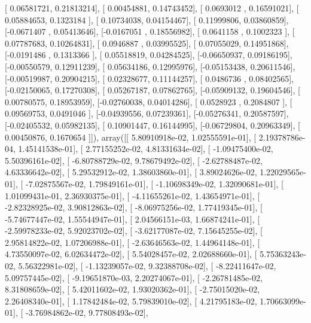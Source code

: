 \documentclass{article}
\begin{document}
       [ 0.06581721,  0.21813214],
       [ 0.00454881,  0.14743452],
       [ 0.0693012 ,  0.16591021],
       [ 0.05884653,  0.1323184 ],
       [ 0.10734038,  0.04154467],
       [ 0.11999806,  0.03860859],
       [-0.0671407 ,  0.05413646],
       [-0.0167051 ,  0.18556982],
       [ 0.0641158 ,  0.1002323 ],
       [ 0.07787683,  0.10264831],
       [ 0.0946887 ,  0.03995525],
       [ 0.07055029,  0.14951868],
       [-0.0191486 ,  0.1313366 ],
       [ 0.05518819,  0.04284525],
       [-0.06650937,  0.09186195],
       [-0.00550579,  0.12911239],
       [ 0.05634186,  0.12995976],
       [-0.05153438,  0.20611546],
       [-0.00519987,  0.20904215],
       [ 0.02328677,  0.11144257],
       [ 0.0486736 ,  0.08402565],
       [-0.02150065,  0.17270308],
       [ 0.05267187,  0.07862765],
       [-0.05909132,  0.19604546],
       [ 0.00780575,  0.18953959],
       [-0.02760038,  0.04014286],
       [ 0.0528923 ,  0.2084807 ],
       [ 0.09569753,  0.0491046 ],
       [-0.04939556,  0.07239361],
       [-0.05276341,  0.20587597],
       [-0.02405532,  0.05982135],
       [ 0.10901447,  0.16144995],
       [-0.06729804,  0.20963349],
       [ 0.00450876,  0.1670654 ]]), array([[  5.80910918e-02,   1.02555591e-01],
       [  2.19378786e-04,   1.45141538e-01],
       [  2.77155252e-02,   4.81331634e-02],
       [ -1.09475400e-02,   5.50396161e-02],
       [ -6.80788729e-02,   9.78679492e-02],
       [ -2.62788487e-02,   4.63336642e-02],
       [  5.29532912e-02,   1.38603860e-01],
       [  3.89024626e-02,   1.22029565e-01],
       [ -7.02875567e-02,   1.79849161e-01],
       [ -1.10698349e-02,   1.32090681e-01],
       [  1.01099431e-01,   2.36930375e-01],
       [ -4.11655261e-02,   1.43654971e-01],
       [ -2.82328925e-02,   3.90812863e-02],
       [ -8.06975256e-02,   1.77419345e-01],
       [ -5.74677447e-02,   1.55544947e-01],
       [  2.04566151e-03,   1.66874241e-01],
       [ -2.59978233e-02,   5.92023702e-02],
       [ -3.62177087e-02,   7.15645255e-02],
       [  2.95814822e-02,   1.07206988e-01],
       [ -2.63646563e-02,   1.44964148e-01],
       [  4.73550097e-02,   6.02634472e-02],
       [  5.54028457e-02,   2.02688660e-01],
       [  5.75363243e-02,   5.56322981e-02],
       [ -1.13239057e-02,   9.32388708e-02],
       [ -8.22411647e-02,   5.09757445e-02],
       [ -9.19651870e-03,   2.20274067e-01],
       [ -2.26781485e-02,   8.31808659e-02],
       [  5.42011602e-02,   1.93020362e-01],
       [ -2.75015020e-02,   2.26408340e-01],
       [  1.17842484e-02,   5.79839010e-02],
       [  4.21795183e-02,   1.70663099e-01],
       [ -3.76984862e-02,   9.77808493e-02],
\end{document}
